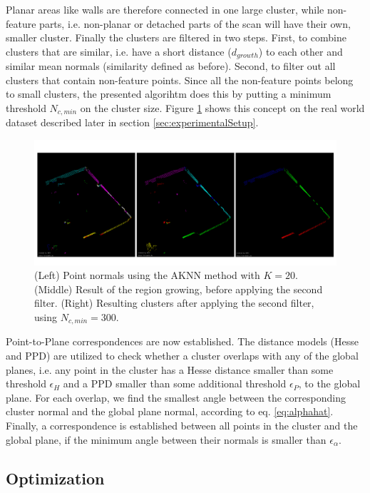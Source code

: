 Planar areas like walls are therefore connected in one large cluster, while non-feature parts, i.e. non-planar or detached parts of the scan will have their own, smaller cluster.
Finally the clusters are filtered in two steps.
First, to combine clusters that are similar, i.e. have a short distance ($d_{growth}$) to each other and similar mean normals (similarity defined as before).
Second, to filter out all clusters that contain non-feature points.
Since all the non-feature points belong to small clusters, the presented algorihtm does this by putting a minimum threshold $N_{c,min}$ on the cluster size.
Figure \ref{fig:clustering} shows this concept on the real world dataset described later in section \ref{sec:experimentalSetup}.

\begin{figure}
	\includegraphics[width=\linewidth]{images/clustering}
	\caption{(Left) Point normals using the AKNN method with $K = 20$. (Middle) Result of the region growing, before applying the second filter. (Right) Resulting clusters after applying the second filter, using $N_{c,min} = 300$. }
	\label{fig:clustering}
\end{figure}

Point-to-Plane correspondences are now established.
The distance models (Hesse and PPD) are utilized to check whether a cluster overlaps with any of the global planes, i.e. any point in the cluster has a Hesse distance smaller than some threshold $\epsilon_H$ and a PPD smaller than some additional threshold $\epsilon_P$, to the global plane.
For each overlap, we find the smallest angle between the corresponding cluster normal and the global plane normal, according to eq. \ref{eq:alphahat}.
Finally, a correspondence is established between all points in the cluster and the global plane, if the minimum angle between their normals is smaller than $\epsilon_\alpha$. 

\subsection{Optimization}

